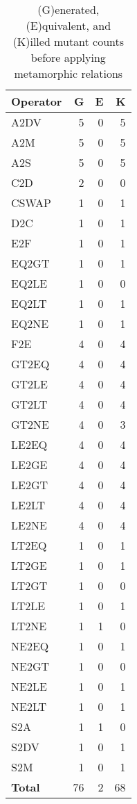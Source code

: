 \begin{table}
    \centering
    \begin{tabular}{lrrr}
    \toprule
    \textbf{Operator} & \textbf{G} & \textbf{E} & \textbf{K} \\
    \midrule


A2DV	&	5	&	0	&	5	\\
A2M	    &	5	&	0	&	5	\\
A2S	    &	5	&	0	&	5	\\
C2D	    &	2	&	0	&	0	\\
CSWAP	&	1	&	0	&	1	\\
D2C	    &	1	&	0	&	1	\\
E2F	    &	1	&	0	&	1	\\
EQ2GT	&	1	&	0	&	1	\\
EQ2LE	&	1	&	0	&	0	\\
EQ2LT	&	1	&	0	&	1	\\
EQ2NE	&	1	&	0	&	1	\\
F2E	&	4	&	0	&	4	\\
GT2EQ	&	4	&	0	&	4	\\
GT2LE	&	4	&	0	&	4	\\
GT2LT	&	4	&	0	&	4	\\
GT2NE	&	4	&	0	&	3	\\
LE2EQ	&	4	&	0	&	4	\\
LE2GE	&	4	&	0	&	4	\\
LE2GT	&	4	&	0	&	4	\\
LE2LT	&	4	&	0	&	4	\\
LE2NE	&	4	&	0	&	4	\\
LT2EQ	&	1	&	0	&	1	\\
LT2GE	&	1	&	0	&	1	\\
LT2GT	&	1	&	0	&	0	\\
LT2LE	&	1	&	0	&	1	\\
LT2NE	&	1	&	1	&	0	\\
NE2EQ	&	1	&	0	&	1	\\
NE2GT	&	1	&	0	&	0	\\
NE2LE	&	1	&	0	&	1	\\
NE2LT	&	1	&	0	&	1	\\
S2A	    &	1	&	1	&	0	\\
S2DV	&	1	&	0	&	1	\\
S2M	    &	1	&	0	&	1	\\
   
    \midrule
    \textbf{Total} & 76 & 2 & 68 \\
    \bottomrule
    \end{tabular}
    \caption{(G)enerated, (E)quivalent, and (K)illed mutant counts before applying metamorphic relations}
    \label{tab:mutant-counts}
\end{table}

